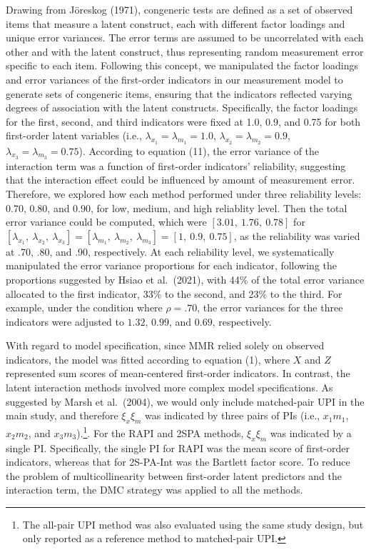 \documentclass[
  man]{apa6}
\begin{document}
Drawing from Jöreskog (1971), congeneric tests are defined as a set of observed items that measure a latent construct, each with different factor loadings and unique error variances. The error terms are assumed to be uncorrelated with each other and with the latent construct, thus representing random measurement error specific to each item. Following this concept, we manipulated the factor loadings and error variances of the first-order indicators in our measurement model to generate sets of congeneric items, ensuring that the indicators reflected varying degrees of association with the latent constructs. Specifically, the factor loadings for the first, second, and third indicators were fixed at 1.0, 0.9, and 0.75 for both first-order latent variables (i.e., \(\lambda_{x_{1}} = \lambda_{m_{1}} = 1.0\), \(\lambda_{x_{2}} = \lambda_{m_{2}} = 0.9\), \(\lambda_{x_{3}} = \lambda_{m_{3}} = 0.75\)). According to equation (11), the error variance of the interaction term was a function of first-order indicators' reliability, suggesting that the interaction effect could be influenced by amount of measurement error. Therefore, we explored how each method performed under three reliability levels: 0.70, 0.80, and 0.90, for low, medium, and high reliablity level. Then the total error variance could be computed, which were \([3.01, \ 1.76, \ 0.78]\) for \([\lambda_{x_{1}}, \ \lambda_{x_{2}}, \ \lambda_{x_{3}}] = [\lambda_{m_{1}}, \ \lambda_{m_{2}}, \ \lambda_{m_{3}}] = [1, \ 0.9, \ 0.75]\), as the reliability was varied at .70, .80, and .90, respectively. At each reliability level, we systematically manipulated the error variance proportions for each indicator, following the proportions suggested by Hsiao et al.~(2021), with 44\% of the total error variance allocated to the first indicator, 33\% to the second, and 23\% to the third. For example, under the condition where \(\rho = .70\), the error variances for the three indicators were adjusted to \(1.32\), \(0.99\), and \(0.69\), respectively.

With regard to model specification, since MMR relied solely on observed indicators, the model was fitted according to equation (1), where \(X\) and \(Z\) represented sum scores of mean-centered first-order indicators. In contrast, the latent interaction methods involved more complex model specifications. As suggested by Marsh et al.~(2004), we would only include matched-pair UPI in the main study, and therefore \(\xi_{x}\xi_{m}\) was indicated by three pairs of PIs (i.e., \(x_{1}m_{1}\), \(x_{2}m_{2}\), and \(x_{3}m_{3}\)).\footnote{The all-pair UPI method was also evaluated using the same study design, but only reported as a reference method to matched-pair UPI.}. For the RAPI and 2SPA methods, \(\xi_{x}\xi_{m}\) was indicated by a single PI. Specifically, the single PI for RAPI was the mean score of first-order indicators, whereas that for 2S-PA-Int was the Bartlett factor score. To reduce the problem of multicollinearity between first-order latent predictors and the interaction term, the DMC strategy was applied to all the methods.
\end{document}
